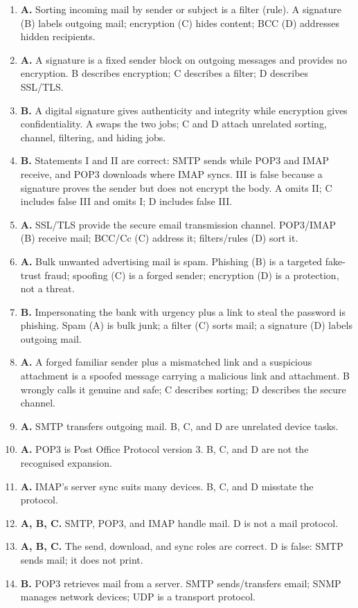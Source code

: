 \begin{enumerate}[label=\textbf{Q\arabic*.}, leftmargin=*]
  hidden from the other recipients. B exposes BCC; C wrongly hides Cc; D
  wrongly claims the sender is unaware of BCC.
\item \textbf{A.} Sorting incoming mail by sender or subject is a filter
  (rule). A signature (B) labels outgoing mail; encryption (C) hides content;
  BCC (D) addresses hidden recipients.
\item \textbf{A.} A signature is a fixed sender block on outgoing messages
  and provides no encryption. B describes encryption; C describes a filter;
  D describes SSL/TLS.
\item \textbf{B.} A digital signature gives authenticity and integrity while
  encryption gives confidentiality. A swaps the two jobs; C and D attach
  unrelated sorting, channel, filtering, and hiding jobs.
\item \textbf{B.} Statements I and II are correct: SMTP sends while POP3 and
  IMAP receive, and POP3 downloads where IMAP syncs. III is false because a
  signature proves the sender but does not encrypt the body. A omits II; C
  includes false III and omits I; D includes false III.
\item \textbf{A.} SSL/TLS provide the secure email transmission channel.
  POP3/IMAP (B) receive mail; BCC/Cc (C) address it; filters/rules (D) sort
  it.
\item \textbf{A.} Bulk unwanted advertising mail is spam. Phishing (B) is a
  targeted fake-trust fraud; spoofing (C) is a forged sender; encryption (D)
  is a protection, not a threat.
\item \textbf{B.} Impersonating the bank with urgency plus a link to steal
  the password is phishing. Spam (A) is bulk junk; a filter (C) sorts mail;
  a signature (D) labels outgoing mail.
\item \textbf{A.} A forged familiar sender plus a mismatched link and a
  suspicious attachment is a spoofed message carrying a malicious link and
  attachment. B wrongly calls it genuine and safe; C describes sorting; D
  describes the secure channel.

\item \textbf{A.} SMTP transfers outgoing mail. B, C, and D are unrelated device tasks.
\item \textbf{A.} POP3 is Post Office Protocol version 3. B, C, and D are not the recognised expansion.
\item \textbf{A.} IMAP's server sync suits many devices. B, C, and D misstate the protocol.
\item \textbf{A, B, C.} SMTP, POP3, and IMAP handle mail. D is not a mail protocol.
\item \textbf{A, B, C.} The send, download, and sync roles are correct. D is false: SMTP sends mail; it does not print.
\item \textbf{B.} POP3 retrieves mail from a server. SMTP sends/transfers email; SNMP manages network devices; UDP is a transport protocol.


\end{enumerate}

